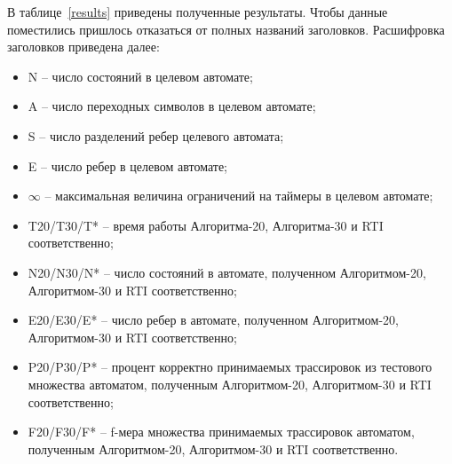 \documentclass[times,specification,annotation]{itmo-student-thesis}
\begin{document}
В таблице~\ref{results} приведены полученные результаты. Чтобы данные поместились пришлось отказаться от полных названий заголовков.
Расшифровка заголовков приведена далее:
\begin{itemize}
  \item N -- число состояний в целевом автомате;
  \item A -- число переходных символов в целевом автомате;
  \item S -- число разделений ребер целевого автомата;
  \item E -- число ребер в целевом автомате;
  \item $\infty$ -- максимальная величина ограничений на таймеры в целевом автомате;
  \item T20\slash T30\slash T* -- время работы Алгоритма-20, Алгоритма-30 и RTI соответственно;
  \item N20\slash N30\slash N* -- число состояний в автомате, полученном Алгоритмом-20, Алгоритмом-30 и RTI соответственно;
  \item E20\slash E30\slash E* -- число ребер в автомате, полученном Алгоритмом-20, Алгоритмом-30 и RTI соответственно;
  \item P20\slash P30\slash P* -- процент корректно принимаемых трассировок из тестового множества автоматом, полученным Алгоритмом-20, Алгоритмом-30 и RTI соответственно;
  \item F20\slash F30\slash F* -- f-мера множества принимаемых трассировок автоматом, полученным Алгоритмом-20, Алгоритмом-30 и RTI соответственно.
\end{itemize}
\end{document}
